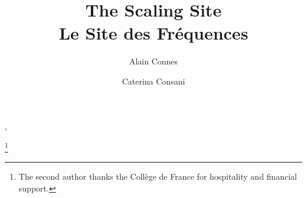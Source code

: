 \documentclass{elsart3-1}
\begin{document}
\centerline{}
\begin{frontmatter}


\title{The Scaling Site\\\vspace{.05in}
Le Site des Fr\' equences}



\author[authorlabel1]{Alain Connes},
\author[authorlabel2]{Caterina Consani}
\thanks[label2]{The second author thanks the Coll\`ege de France for hospitality and financial support.}


\address[authorlabel1]{Coll\`ege de France,
3 rue d'Ulm, Paris F-75005 France;
I.H.E.S. and Ohio State University}
\address[authorlabel2]{The Johns Hopkins
University, Baltimore, MD 21218 USA}



\begin{abstract}

\vspace*{-.4cm}


\end{abstract}
\end{frontmatter}
\end{document}

